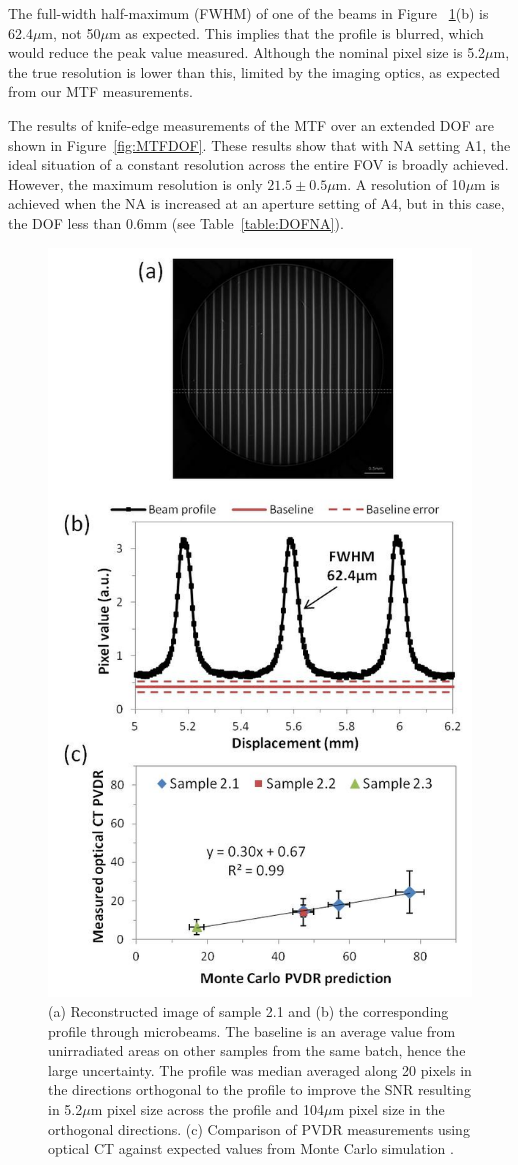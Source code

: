	The full-width half-maximum (FWHM) of one of the beams in Figure ~\ref{fig:Fig7}(b) is 62.4$\mu$m, not 50$\mu$m as expected. This implies that the profile is blurred, which would reduce the peak value measured. Although the nominal pixel size is 5.2$\mu$m, the true resolution is lower than this, limited by the imaging optics, as expected from our MTF measurements. 
	
	The results of knife-edge measurements of the MTF over an extended DOF are shown in Figure~\ref{fig:MTFDOF}. These results show that with NA setting A1, the ideal situation of a constant resolution across the entire FOV is broadly achieved. However, the maximum resolution is only $21.5 \pm 0.5\mu$m. A resolution of 10$\mu$m is achieved when the NA is increased at an aperture setting of A4, but in this case, the DOF less than 0.6mm (see Table~\ref{table:DOFNA}).
	
	\begin{figure}
		\centering
		\includegraphics[width=0.6\linewidth]{mrt_img/mrt_Fig7}
		\caption{(a) Reconstructed image of sample 2.1 and (b) the corresponding profile through microbeams. The baseline is an average value from unirradiated areas on other samples from the same batch, hence the large uncertainty. The profile was median averaged along 20 pixels in the directions orthogonal to the profile to improve the SNR resulting in 5.2$\mu$m pixel size across the profile and 104$\mu$m pixel size in the orthogonal directions. (c) Comparison of PVDR measurements using optical CT against expected values from Monte Carlo simulation \cite{martinez-roviradevelopment2012}.}
		\label{fig:Fig7}
	\end{figure}
	
